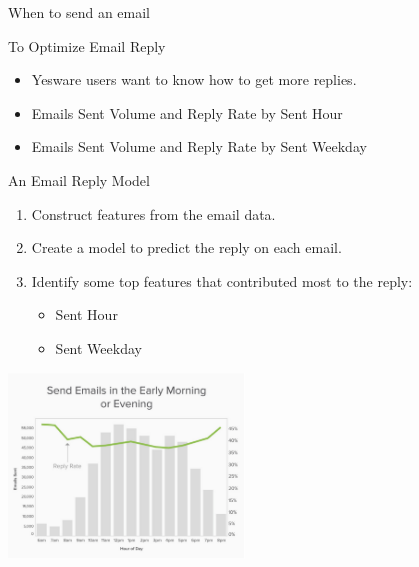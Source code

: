 \documentclass[10pt]{beamer}
\begin{document}
    \begin{frame}{When to send an email}
          \begin{block}{To Optimize Email Reply}
            \begin{itemize}
              \item<1-> Yesware users want to know how to get more replies.
              \item<3-> Emails Sent Volume and Reply Rate by \alert<3>{Sent Hour}
              \item<4-> Emails Sent Volume and Reply Rate by \alert<4>{Sent Weekday}
            \end{itemize}
          \end{block}
          \begin{overprint}
              \begin{alertblock}{An Email Reply Model}
                \begin{enumerate}
                  \item Construct features from the email data.
                  \item Create a model to predict the reply on each email.
                  \item Identify some top features that contributed most to the reply:
                    \begin{itemize}
                      \item Sent Hour
                      \item Sent Weekday
                    \end{itemize}
                \end{enumerate}
              \end{alertblock}
            \begin{center}
              \includegraphics[height=140pt]{../graphs/email_analysis_sent_hour}
            \end{center}
            \begin{center}

\end{center}
\end{overprint}
\end{frame}
\end{document}
